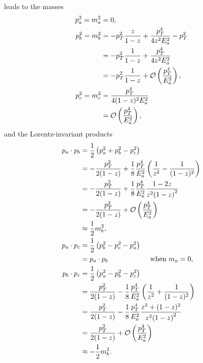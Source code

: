 \begin{subappendices}
 leads to the masses
\begin{align}
    p_a^2 = m_a^2 &= 0
    ,
    \\
    p_b^2
    =
    m_b^2
    &=
    -p_T^2\frac{z}{1-z}
    +
    \frac{p_T^4}{4 z^2 E_a^2}
    -
    p_T^2
    \\
    \notag
    &=
    - p_T^2 \frac{1}{1-z}
    +
    \frac{p_T^4}{4 z^2 E_a^2}
    \\
    \notag
    &=
    -p_T^2 \frac{1}{1-z}
    +
    \mathcal{O}\left(\frac{p_T^4}{E_a^2}\right)
    ,
    \\
    p_c^2 =
    m_c^2
    &=
    \frac{p_T^4}{4 (1-z)^2 E_a^2}
    \\
    \notag
    &=
    \mathcal{O}\left(\frac{p_T^4}{E_a^2}\right)
    ,
\end{align}
and the Lorentz-invariant products
\begin{align}
    p_a \cdot p_b
    &=
    \frac{1}{2}\left(p_a^2 + p_b^2 - p_c^2\right)
    \\
    \notag
    &=
    -\frac{p_T^2}{2(1-z)}
    +
    \frac{1}{8}
    \frac{p_T^4}{E_a^2}
    \left(\frac{1}{z^2} - \frac{1}{(1-z)^2}\right)
    \\
    \notag
    &=
    -\frac{p_T^2}{2(1-z)}
    +
    \frac{1}{8}
    \frac{p_T^4}{E_a^2}
    \frac{1 - 2 z}{z^2 {(1-z)}^2}
    \\
    \notag
    &=
    -\frac{p_T^2}{2(1-z)}
    +
    \mathcal{O}\left(\frac{p_T^4}{E_a^2}\right)
    \\
    \notag
    &
    \approx
    \frac{1}{2} m_b^2
    ,
    \\
    p_a \cdot p_c
    &=
    \frac{1}{2}\left(p_b^2 - p_c^2 - p_a^2\right)
    \\
    \notag
    &=
    p_a \cdot p_b
    \qquad\qquad\qquad
    \text{when \(m_a = 0\)}
    ,
    \\
    p_b \cdot p_c
    &=
    \frac{1}{2}\left(p_a^2 - p_b^2 - p_c^2\right)
    \\
    \notag
    &=
    \frac{p_T^2}{2(1-z)}
    -
    \frac{1}{8}
    \frac{p_T^4}{E_a^2}
    \left(\frac{1}{z^2} + \frac{1}{(1-z)^2}\right)
    \\
    \notag
    &=
    \frac{p_T^2}{2(1-z)}
    -
    \frac{1}{8}
    \frac{p_T^4}{E_a^2}
    \frac{z^2 + (1-z)^2}{z^2 {(1-z)}^2}
    \\
    \notag
    &=
    \frac{p_T^2}{2(1-z)}
    +
    \mathcal{O}\left(\frac{p_T^4}{E_a^2}\right)
    \\
    \notag
    &\approx
    -\frac{1}{2} m_b^2
    .
\end{align}


\end{subappendices}
